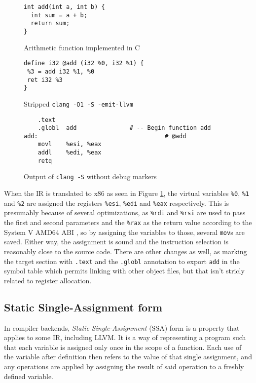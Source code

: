 \documentclass{article}
\begin{document}
\begin{figure}[H]
   \begin{minipage}{0.48\textwidth}
     \centering
     \begin{verbatim}
int add(int a, int b) {
  int sum = a + b;
  return sum;
}
     \end{verbatim}
     \caption{Arithmetic function implemented in C}\label{fig:addc}
   \end{minipage}\hfill
   \begin{minipage}{0.48\textwidth}
     \centering
     \begin{verbatim}
define i32 @add (i32 %0, i32 %1) {
 %3 = add i32 %1, %0
 ret i32 %3
}
     \end{verbatim}
     \caption{Stripped \texttt{clang -O1 -S -emit-llvm}}\label{fig:addll}
   \end{minipage}
   \begin{center}
   \begin{minipage}{0.83\textwidth}
     \centering
     \begin{verbatim}
	.text
	.globl	add               # -- Begin function add
add:                                    # @add
	movl	%esi, %eax
	addl	%edi, %eax
	retq
     \end{verbatim}
     \caption{Output of \texttt{clang -S} without debug markers}\label{fig:addx86}
   \end{minipage}
   \end{center}
\end{figure}
When the IR is translated to x86 as seen in Figure \ref{fig:addx86}, the virtual variables \texttt{\%0}, \texttt{\%1} and \texttt{\%2} are assigned the registers \texttt{\%esi}, \texttt{\%edi} and \texttt{\%eax} respectively. This is presumably because of several optimizations, as \texttt{\%rdi} and \texttt{\%rsi} are used to pass the first and second parameters and the \texttt{\%rax} as the return value according to the System V AMD64 ABI \cite{sysv}, so by assigning the variables to those, several \texttt{mov}s are saved. Either way, the assignment is sound and the instruction selection is reasonably close to the  source code. There are other changes as well, as marking the target section with \texttt{.text} and the \texttt{.globl} annotation to export \texttt{add} in the symbol table which permits linking with other object files, but that isn't stricly related to register allocation.


\subsection{Static Single-Assignment form}
In compiler backends, \textit{Static Single-Assignment} (SSA) form is a property that applies to some IR, including LLVM.
It is a way of representing a program such that each variable is assigned only once in
the scope of a function. Each use of the variable after definition then refers to the value  of that  single assignment, and any operations are applied by assigning the result of said operation to a freshly defined variable.
\end{document}
